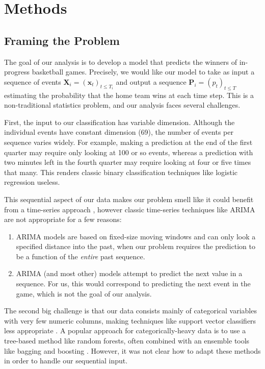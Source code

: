 \section{Methods}
\label{sec:methods}

\subsection{Framing the Problem}

The goal of our analysis is to develop a model that predicts the winners of in-progress basketball games. Precisely, we would like our model to take as input a sequence of events $\mathbf X_i = (\mathbf x_t)_{t \leq T_i}$ and output a sequence $\mathbf P_i = (p_t)_{t \leq T}$ estimating the probability that the home team wins at each time step. This is a non-traditional statistics problem, and our analysis faces several challenges.

First, the input to our classification has variable dimension. Although the individual events have constant dimension (69), the number of events per sequence varies widely. For example, making a prediction at the end of the first quarter may require only looking at 100 or so events, whereas a prediction with two minutes left in the fourth quarter may require looking at four or five times that many. This renders classic binary classification techniques like logistic regression useless.

This sequential aspect of our data makes our problem smell like it could benefit from a time-series approach \cite[ch. 4, 5]{TSA}, however classic time-series techniques like ARIMA are not appropriate for a few reasons:
\begin{enumerate}
	\item ARIMA models are based on fixed-size moving windows and can only look a specified distance into the past, when our problem requires the prediction to be a function of the \emph{entire} past sequence.
	\item ARIMA (and most other) models attempt to predict the next value in a sequence. For us, this would correspond to predicting the next event in the game, which is not the goal of our analysis.
\end{enumerate}

The second big challenge is that our data consists mainly of categorical variables with very few numeric columns, making techniques like support vector classifiers less appropriate \cite[\S 9]{ISL}. A popular approach for categorically-heavy data is to use a tree-based method like random forests, often combined with an ensemble tools like bagging and boosting \cite[\S 9, \S 10]{ESL}. However, it was not clear how to adapt these methods in order to handle our sequential input.

